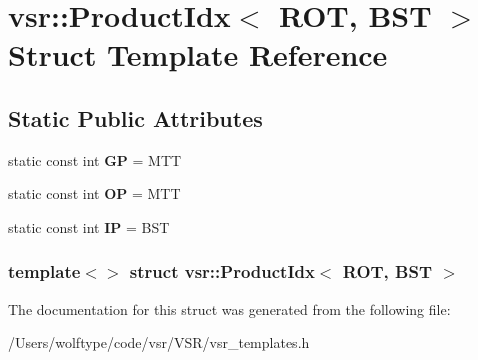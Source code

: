 \hypertarget{structvsr_1_1_product_idx_3_01_r_o_t_00_01_b_s_t_01_4}{\section{vsr\-:\-:Product\-Idx$<$ R\-O\-T, B\-S\-T $>$ Struct Template Reference}
\label{structvsr_1_1_product_idx_3_01_r_o_t_00_01_b_s_t_01_4}
}
\subsection*{Static Public Attributes}
\begin{DoxyCompactItemize}
\item 
\hypertarget{structvsr_1_1_product_idx_3_01_r_o_t_00_01_b_s_t_01_4_ae6112d8f600dccbb1504c5022344ce42}{static const int {\bfseries G\-P} = M\-T\-T}\label{structvsr_1_1_product_idx_3_01_r_o_t_00_01_b_s_t_01_4_ae6112d8f600dccbb1504c5022344ce42}

\item 
\hypertarget{structvsr_1_1_product_idx_3_01_r_o_t_00_01_b_s_t_01_4_a9427de0302cdf6fa571ad4d465358a4f}{static const int {\bfseries O\-P} = M\-T\-T}\label{structvsr_1_1_product_idx_3_01_r_o_t_00_01_b_s_t_01_4_a9427de0302cdf6fa571ad4d465358a4f}

\item 
\hypertarget{structvsr_1_1_product_idx_3_01_r_o_t_00_01_b_s_t_01_4_aa663fed52a8d0e2dd7a5f32cf15e1377}{static const int {\bfseries I\-P} = B\-S\-T}\label{structvsr_1_1_product_idx_3_01_r_o_t_00_01_b_s_t_01_4_aa663fed52a8d0e2dd7a5f32cf15e1377}

\end{DoxyCompactItemize}
\subsubsection*{template$<$$>$ struct vsr\-::\-Product\-Idx$<$ R\-O\-T, B\-S\-T $>$}



The documentation for this struct was generated from the following file\-:\begin{DoxyCompactItemize}
\item 
/\-Users/wolftype/code/vsr/\-V\-S\-R/vsr\-\_\-templates.\-h\end{DoxyCompactItemize}

